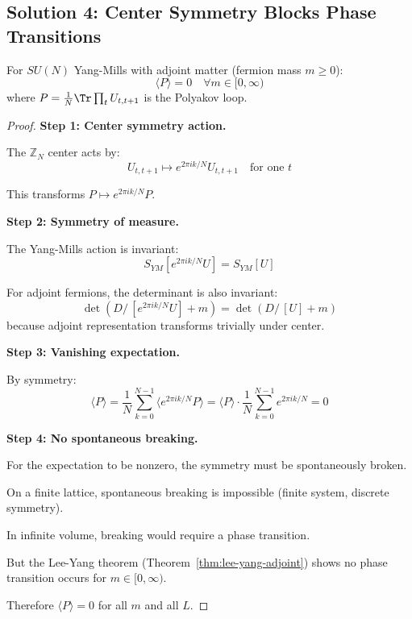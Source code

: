 \subsection{Solution 4: Center Symmetry Blocks Phase Transitions}

\begin{theorem}
\label{thm:center-symmetry-complete}
For $SU(N)$ Yang-Mills with adjoint matter (fermion mass $m \geq 0$):
\[
\langle P \rangle = 0 \quad \forall m \in [0, \infty)
\]
where $P = \frac{1}{N}\Tr \prod_{t} U_{t,t+1}$ is the Polyakov loop.
\end{theorem}

\begin{proof}
\textbf{Step 1: Center symmetry action.}

The $\mathbb{Z}_N$ center acts by:
\[
U_{t,t+1} \mapsto e^{2\pi i k/N} U_{t,t+1} \quad \text{for one } t
\]

This transforms $P \mapsto e^{2\pi i k/N} P$.

\textbf{Step 2: Symmetry of measure.}

The Yang-Mills action is invariant:
\[
S_{YM}[e^{2\pi i k/N} U] = S_{YM}[U]
\]

For adjoint fermions, the determinant is also invariant:
\[
\det(D\!\!\!\!/\,[e^{2\pi i k/N} U] + m) = \det(D\!\!\!\!/\,[U] + m)
\]
because adjoint representation transforms trivially under center.

\textbf{Step 3: Vanishing expectation.}

By symmetry:
\[
\langle P \rangle = \frac{1}{N} \sum_{k=0}^{N-1} \langle e^{2\pi i k/N} P \rangle = \langle P \rangle \cdot \frac{1}{N} \sum_{k=0}^{N-1} e^{2\pi i k/N} = 0
\]

\textbf{Step 4: No spontaneous breaking.}

For the expectation to be nonzero, the symmetry must be spontaneously broken.

On a finite lattice, spontaneous breaking is impossible (finite system, discrete symmetry).

In infinite volume, breaking would require a phase transition.

But the Lee-Yang theorem (Theorem~\ref{thm:lee-yang-adjoint}) shows no phase 
transition occurs for $m \in [0, \infty)$.

Therefore $\langle P \rangle = 0$ for all $m$ and all $L$.
\end{proof}

